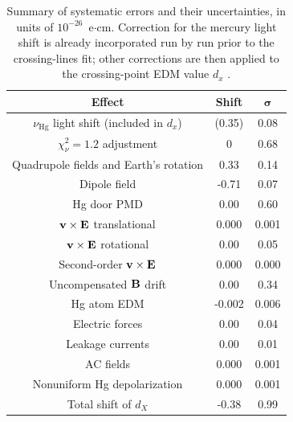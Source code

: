 \begin{table}[h!]
  \begin{center}
    \begin{tabular}{|c||c|c|}
      \hline
      \bf{Effect} & \bf{Shift} & $\boldsymbol{\sigma}$ \\ \hline \hline
      $\nu_{\mathrm{Hg}}$ light shift (included in $d_x$) & (0.35) & 0.08 \\ \hline
      $\chi_{\nu}^2 = 1.2$ adjustment & 0 & 0.68 \\ \hline
      Quadrupole fields and Earth's rotation & 0.33 & 0.14 \\ \hline
      Dipole field & -0.71 & 0.07 \\ \hline
      Hg door PMD & 0.00 & 0.60 \\ \hline
      $\bf{v} \times \bf{E}$ translational & 0.000 & 0.001 \\\hline
      $\bf{v} \times \bf{E}$ rotational & 0.00 & 0.05 \\ \hline
      Second-order $\bf{v} \times \bf{E}$ & 0.000 & 0.000 \\ \hline
      Uncompensated $\bf{B}$ drift & 0.00 & 0.34 \\ \hline
      Hg atom EDM & -0.002 & 0.006 \\ \hline
      Electric forces & 0.00 & 0.04 \\ \hline
      Leakage currents & 0.00 & 0.01 \\ \hline
      AC fields & 0.000 & 0.001 \\ \hline
      Nonuniform Hg depolarization & 0.000 & 0.001 \\ \hline
      Total shift of $d_X$ & -0.38 & 0.99 \\ \hline
    \end{tabular}
  \end{center}
  \caption[Summary of systematic errors for the most recent nEDM
  measurement]{\cite{Pendlebury2015}Summary of systematic errors and
    their uncertainties, in units of $10^{-26}$~e$\cdot$cm. Correction
    for the mercury light shift is already incorporated run by run
    prior to the crossing-lines fit; other corrections are then
    applied to the crossing-point EDM value $d_x$ .}
  \label{tab:nedmsystematics}
\end{table}

